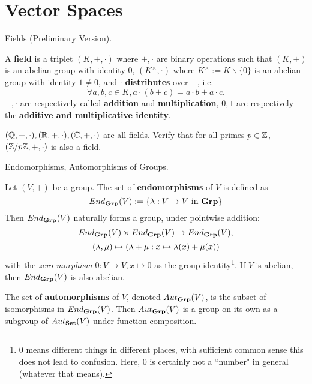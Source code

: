 \documentclass[../book.tex]{subfiles}
\begin{document}
\section{Vector Spaces}
\begin{dfn} Fields (Preliminary Version).

    A \textbf{field} is a triplet $(K,+,\cdot)$ where
    $+, \cdot$ are binary operations such that
    $(K,+)$ is an abelian group with identity $0$,
    $(K^\times,\cdot)$ where $K^\times := K\backslash\{0\}$
    is an abelian group with identity $1 \neq 0$,
    and $\cdot$ \textbf{distributes} over $+$, i.e.
    \[\forall a, b, c \in K, a \cdot (b + c) = a \cdot b + a \cdot c.\]
    $+,\cdot$ are respectively called \textbf{addition} and \textbf{multiplication}, 
    $0, 1$ are respectively the \textbf{additive and multiplicative identity}. 
\end{dfn}

\begin{eg}
    $(\mathbb{Q},+,\cdot), (\mathbb{R},+,\cdot), (\mathbb{C},+,\cdot)$ are all fields. 
    Verify that for all primes $p \in \mathbb{Z}$, $(\mathbb{Z}/p\mathbb{Z},+,\cdot)$
    is also a field.
\end{eg}

\begin{dfn} Endomorphisms, Automorphisms of Groups.

    Let $(V,+)$ be a group. 
    The set of \textbf{endomorphisms} of $V$ is defined as
    \[ 
        End_{\mathbf{Grp}}(V) := \{\lambda : V \to V \text{ in } \mathbf{Grp}\} 
    \]
    Then $End_{\mathbf{Grp}}(V)$ naturally forms a group, under pointwise addition:
    \[
        End_{\mathbf{Grp}}(V) \times End_{\mathbf{Grp}}(V) \to End_{\mathbf{Grp}}(V), 
    \]
    \[
        (\lambda, \mu) \mapsto (\lambda + \mu : x \mapsto \lambda(x) + \mu(x))
    \]
    with the \emph{zero morphism} $0 : V \to V, 
    x \mapsto 0$ as the group identity\footnote{
    $0$ means different things in different places,
    with sufficient common sense this does not lead to confusion. 
    Here, $0$ is certainly not a ``number" in general 
    (whatever that means).}.
    If $V$ is abelian, then $End_{\mathbf{Grp}}(V)$ is also abelian. 
    
    The set of \textbf{automorphisms} of $V$, denoted $Aut_{\mathbf{Grp}}(V)$, 
    is the subset of isomorphisms in $End_{\mathbf{Grp}}(V)$. 
    Then $Aut_{\mathbf{Grp}}(V)$ is a group on its own
    as a subgroup of $Aut_{\mathbf{Set}}(V)$ under function composition. 
    
\end{dfn}
\end{document}
